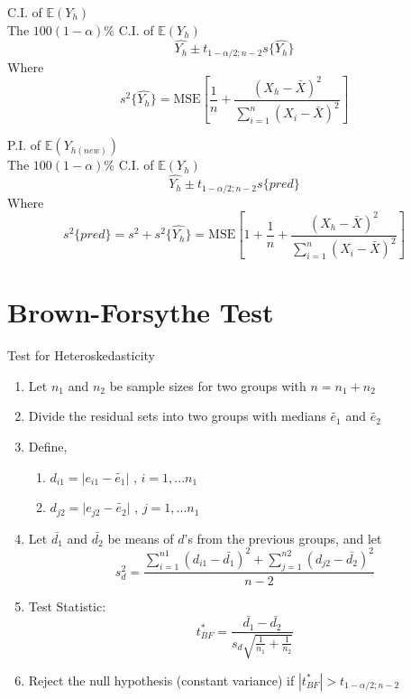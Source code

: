 \documentclass[14pt, oneside, letterpaper, fleqn]{notes}
\begin{document}
\begin{remark} C.I. of $\mathbb{E}(Y_h)$ \\
The $100(1-\alpha)\%$ C.I. of $\mathbb{E}(Y_h)$ \\
\[
\hat{Y_h} \pm t_{1-\alpha/2;n-2}s\{\hat{Y_h}\}
\]
Where
\[
s^2\{\hat{Y_h}\} = 
\text{MSE}[\frac{1}{n} + 
\frac{(X_h - \bar{X})^2}{\sum_{i=1}^n(X_i - \bar{X})^2}]
\]
\end{remark}


\begin{remark} P.I. of $\mathbb{E}(Y_{h(new)})$ \\
The $100(1-\alpha)\%$ C.I. of $\mathbb{E}(Y_h)$ \\
\[
\hat{Y_h} \pm t_{1-\alpha/2;n-2}s\{pred\}
\]
Where
\[
s^2\{pred\} = s^2 + s^2\{\hat{Y_h}\} = 
\text{MSE}[1+ \frac{1}{n} + 
\frac{(X_h - \bar{X})^2}{\sum_{i=1}^n(X_i - \bar{X})^2}]
\]
\end{remark}

%
%

\section*{Brown-Forsythe Test}
Test for Heteroskedasticity
\begin{enumerate}
\item Let $n_1$ and $n_2$ be sample sizes for two groups
with $n=n_1 + n_2$

\item Divide the residual sets into two groups with
medians $\tilde{e_1}$ and $\tilde{e_2}$

\item Define,
	\begin{enumerate}
	\item $d_{i1} = \lvert e_{i1} - \tilde{e_1} \rvert$
	, $i=1,...n_1$
	\item $d_{j2} = \lvert e_{j2} - \tilde{e_2} \rvert$
	, $j=1,...n_1$
	\end{enumerate}

\item Let $\bar{d_1}$ and $\bar{d_2}$ be means of $d$'s 
from the previous groups, and let 
\[
s_d^2 = \frac{\sum_{i=1}^{n1}(d_{i1} - \bar{d_1})^2 + 
\sum_{j=1}^{n2}(d_{j2} - \bar{d_2})^2}
{n-2}
\]

\item Test Statistic:
\[
t_{BF}^* = \frac{\bar{d_1} - \bar{d_2}}
{s_d\sqrt{\frac{1}{n_1} + \frac{1}{n_2}}}
\]

\item Reject the null hypothesis (constant variance) if
$|t_{BF}^*| > t_{1-\alpha/2;n-2}$

\end{enumerate}
\end{document}
